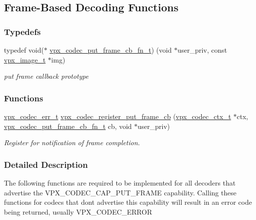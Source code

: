 \hypertarget{group__cap__put__frame}{}\subsection{Frame-\/\+Based Decoding Functions}
\label{group__cap__put__frame}
\subsubsection*{Typedefs}
\begin{DoxyCompactItemize}
\item 
typedef void($\ast$ \hyperlink{group__cap__put__frame_gab570c589b333dcccf61b3164cc95234e}{vpx\+\_\+codec\+\_\+put\+\_\+frame\+\_\+cb\+\_\+fn\+\_\+t}) (void $\ast$user\+\_\+priv, const \hyperlink{vpx__image_8h_abf5ac962cc6d71b4f0e39b1b0d033e55}{vpx\+\_\+image\+\_\+t} $\ast$img)
\begin{DoxyCompactList}\small\item\em put frame callback prototype \end{DoxyCompactList}\end{DoxyCompactItemize}
\subsubsection*{Functions}
\begin{DoxyCompactItemize}
\item 
\hyperlink{group__codec_gada1084710837ad363b92f2379dd2b8d2}{vpx\+\_\+codec\+\_\+err\+\_\+t} \hyperlink{group__cap__put__frame_ga299c2d1b265a22a680f117dd686e31ce}{vpx\+\_\+codec\+\_\+register\+\_\+put\+\_\+frame\+\_\+cb} (\hyperlink{group__codec_gad03e2dfa6ae511db7d25be6bbb336233}{vpx\+\_\+codec\+\_\+ctx\+\_\+t} $\ast$ctx, \hyperlink{group__cap__put__frame_gab570c589b333dcccf61b3164cc95234e}{vpx\+\_\+codec\+\_\+put\+\_\+frame\+\_\+cb\+\_\+fn\+\_\+t} cb, void $\ast$user\+\_\+priv)
\begin{DoxyCompactList}\small\item\em Register for notification of frame completion. \end{DoxyCompactList}\end{DoxyCompactItemize}


\subsubsection{Detailed Description}
The following functions are required to be implemented for all decoders that advertise the V\+P\+X\+\_\+\+C\+O\+D\+E\+C\+\_\+\+C\+A\+P\+\_\+\+P\+U\+T\+\_\+\+F\+R\+A\+ME capability. Calling these functions for codecs that don\textquotesingle{}t advertise this capability will result in an error code being returned, usually V\+P\+X\+\_\+\+C\+O\+D\+E\+C\+\_\+\+E\+R\+R\+OR 

